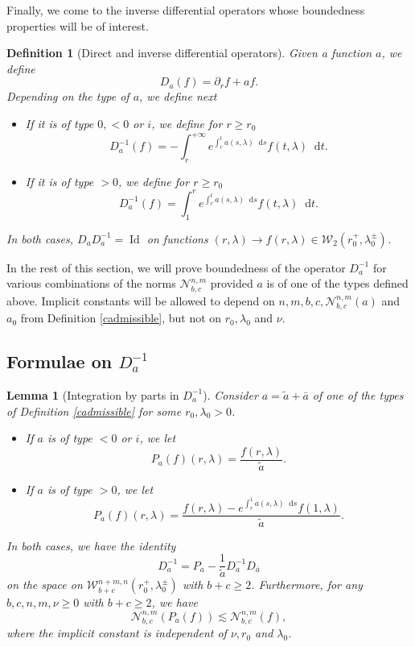 \documentclass[11 pt]{amsart}
\newtheorem{definition}{Definition}[section]
\newtheorem{lem}{Lemma}[section]
\theoremstyle{definition}
\theoremstyle{remark}
\numberwithin{equation}{section}
\newcommand{\dd}{\mathop{}\!\mathrm{d}}
\begin{document}
Finally, we come to the inverse differential operators whose boundedness properties will be of interest.
\begin{definition}[Direct and inverse differential operators]\label{fnpig}
Given a function $a$, we define
\[ D_a (f) = \partial_r f + a f. \]
Depending on the type of $a$, we define next
\begin{itemize}  
\item[1)] If it is of type $0, < 0$ or $i$, we define for $r \geqslant r_0$
  \[ D_a^{- 1} (f) = - \int_r^{+ \infty} e^{\int_r^t a (s, \lambda)\dd s}
     f (t, \lambda)\dd t. \]
  
\item[2)] If it is of type $> 0$, we define for $r \geqslant r_0$
  \[ D_a^{- 1} (f) = \int_1^r e^{\int_r^t a (s, \lambda)\dd s} f (t,
     \lambda)\dd t. \]
\end{itemize}

In both cases, $D_a D_a^{- 1} = \operatorname{Id}$ on functions $(r, \lambda) \rightarrow
  f (r, \lambda) \in \mathcal{W}_{2} (r_0^+, \lambda_0^{\pm})$.
\end{definition}

In the rest of this section, we will prove boundedness of the operator $D_a^{- 1}$ for various combinations of the norms $\mathcal{N}_{b, c}^{n, m}$ provided $a$ is of one of the types defined above. Implicit constants will be allowed to depend on $n, m,
b, c, \mathcal{N}_{b, c}^{n, m} (a)$ and $a_0$ from Definition
\ref{cadmissible}, but not on $r_0, \lambda_0$ and $\nu$.

\subsection{Formulae on $D_a^{- 1}$}

\begin{lem}[Integration by parts in $D_a^{-1}$] 
  \label{khen}Consider $a = \widetilde{a} + \bar{a}$ of one of the types of Definition \ref{cadmissible} for some $r_0, \lambda_0 > 0$.
\begin{itemize}
\item[1)] If $a$ is of type $< 0$ or $i$, we let
  \[ P_a (f) (r, \lambda) = \frac{f (r, \lambda)}{\widetilde{a}} . \]
  
\item[2)] If $a$ is of type $> 0$, we let
  \[ P_a (f) (r, \lambda) = \frac{f (r, \lambda) - e^{\int_r^1 a (s, \lambda)
    \dd s} f (1, \lambda)}{\widetilde{a}} . \]
\end{itemize}

  In both cases, we have the identity
  \[ D_a^{- 1} = P_a - \frac{1}{\widetilde{a}} D_a^{- 1} D_{\bar{a}} \]
on the space on $\mathcal{W}^{n + m,
  n}_{b + c} (r_0^+, \lambda_0^{\pm}) $ with $b + c \geqslant 2$.
Furthermore, for any $b, c, n, m, \nu \geqslant 0$ with $b + c \geqslant 2$, we have
  \[ \mathcal{N}_{b, c}^{n, m} (P_a (f)) \lesssim \mathcal{N}_{b, c}^{n, m}
     (f), \]
  where the implicit constant is independent of $\nu, r_0$ and $\lambda_0$.
\end{lem}
\end{document}
